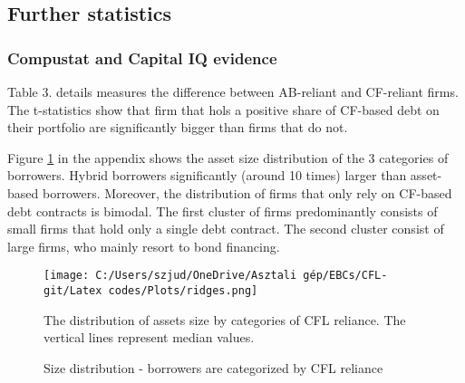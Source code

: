 \documentclass[12pt]{article}
\begin{document}
\newpage
\subsection{Further statistics \label{sec:A4}}
\subsubsection{Compustat and Capital IQ evidence}
Table 3. details measures the difference between AB-reliant and CF-reliant firms. The t-statistics show that firm that hols a positive share of CF-based debt on their portfolio are significantly bigger than firms that do not. 

\begin{table}[H]
\centering
{}
\caption{\small Summary Statistics: a comparison of average values of ABL firms and CFL firms, the P-value reports the probability of the two sample averages being same.} \label{tab:t-tests}
\end{table}
\noindent Figure \ref{chart:ridges} in the appendix shows the asset size distribution of the 3 categories of borrowers. Hybrid borrowers significantly (around 10 times) larger than asset-based borrowers. Moreover, the distribution of firms that only rely on CF-based debt contracts is bimodal. The first cluster of firms predominantly consists of small firms that hold only a single debt contract. The second cluster consist of large firms, who mainly resort to bond financing. 

\begin{figure}[H]  %
    \centering
    \caption{Size distribution - borrowers are categorized by CFL reliance}\label{chart:ridges}
    \texttt{[image: C:/Users/szjud/OneDrive/Asztali gép/EBCs/CFL-git/Latex codes/Plots/ridges.png]} 
    
     \small The distribution of assets size by categories of CFL reliance. The vertical lines represent median values. 
\end{figure}
\end{document}
